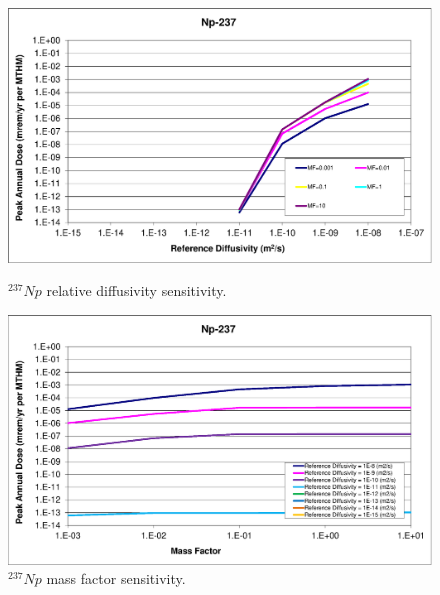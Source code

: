 \begin{figure}[ht]
\begin{minipage}[b]{0.45\linewidth}

\includegraphics[width=\linewidth]{./chapters/nuclide_sensitivity/clay/DiffCoeffAndInvEBSFail/Np-237.eps}
\caption{$^{237}Np$ relative diffusivity sensitivity.} 
\label{fig:DCInvNp237}

\end{minipage}
\hspace{0.05\linewidth}
\begin{minipage}[b]{0.45\linewidth}

\includegraphics[width=\linewidth]{./chapters/nuclide_sensitivity/clay/DiffCoeffAndInvEBSFail/Np-237-MF.eps}
\caption{$^{237}Np$ mass factor sensitivity.}
\label{fig:DCInvNp237MF}

\end{minipage}
\end{figure}


\clearpage


